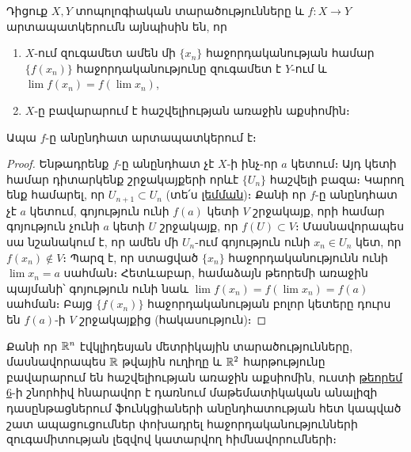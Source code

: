 \documentclass[./main.tex]{subfiles}
\begin{document}
\begin{theorem}\label{ch10thm6}
Դիցուք $X, Y$ տոպոլոգիական տարածությունները և $f:X\rightarrow Y$ արտապատկերումն այնպիսին են, որ
\begin{enumerate}
    \item [ա)] $X$-ում զուգամետ ամեն մի $\{x_n\}$ հաջորդականության համար $\{f(x_n)\}$ հաջոր\-դա\-կա\-նու\-թ\-յունը զուգամետ է $Y$-ում և $\lim f(x_n)=f(\lim x_n)$,
	\item [բ)] $X$-ը բավարարում է հաշվելիության առաջին աքսիոմին։
\end{enumerate}
Ապա $f$-ը անընդհատ արտապատկերում է։
\end{theorem}

\begin{proof} 
Ենթադրենք $f$-ը անընդհատ չէ $X$-ի ինչ-որ $a$ կետում։ Այդ կետի համար դիտարկենք շրջակայքերի որևէ $\{U_n\}$ հաշվելի բազա։ Կարող ենք համարել, որ $U_{n+1}\subset U_n$ (տե՛ս \hyperref[ch10lem1]{լեմման})։ Քանի որ $f$-ը անընդհատ չէ $a$ կետում, գո\-յու\-թյուն ունի $f(a)$ կետի $V$ շրջակայք, որի համար գոյություն չունի $a$ կետի $U$ շրջա\-կայք, որ $f(U)\subset V$։ Մասնավորապես սա նշանակում է, որ ամեն մի $U_n$-ում գո\-յու\-թյուն ունի $x_n\in U_n$ կետ, որ $f(x_n)\notin V$։ Պարզ է, որ ստացված $\{x_n\}$ հա\-ջոր\-դա\-կա\-նու\-թյունն ունի  $\lim x_n=a$ սահման։ Հետևաբար, համաձայն թեորեմի առաջին պայ\-մա\-նի՝ գոյություն ունի նաև $\lim f(x_n)=f(\lim x_n)=f(a)$ սահման։ Բայց $\{f(x_n)\}$ հա\-ջոր\-դա\-կա\-նու\-թյան բոլոր կետերը դուրս են $f(a)$-ի $V$ շրջակայքից (հակասություն)։
\end{proof} 

\begin{note} 
Քանի որ $\mathbb{R}^n$ էվկլիդեսյան մետրիկային տարածությունները, մաս\-նավորապես $\mathbb{R}$ թվային ուղիղը և $\mathbb{R}^2$ հարթությունը բավարարում են հաշվե\-լի\-ու\-թյան առաջին աքսիոմին, ուստի \hyperref[ch10thm6]{թեորեմ 6}-ի շնորհիվ հնարավոր է դառնում մա\-թե\-մա\-տի\-կա\-կան անալի\-զի դաս\-ըն\-թացներում ֆունկցիաների անընդհատության հետ կապ\-ված շատ ապացուցումներ փոխադրել հաջորդականություն\-նե\-րի զու\-գա\-մի\-տու\-թյան լեզ\-վով կատարվող հիմնավորումների։
\end{note}

\newpage


\end{document}
